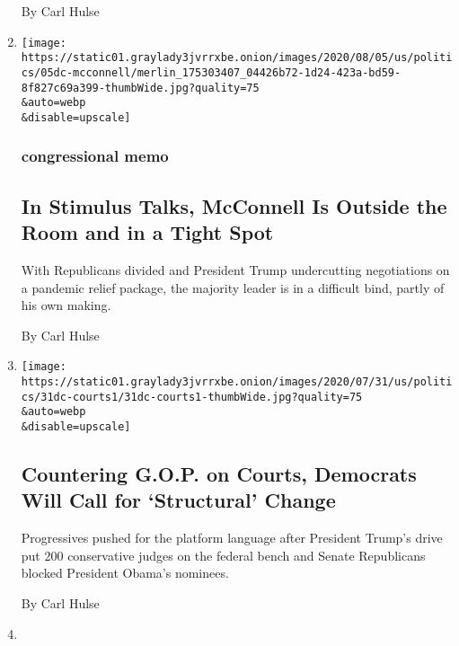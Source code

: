 \begin{enumerate}
  By Carl Hulse
\item
  \href{/2020/08/05/us/politics/mcconnell-stimulus-talks-coronavirus.html}{}

  \texttt{[image: https://static01.graylady3jvrrxbe.onion/images/2020/08/05/us/politics/05dc-mcconnell/merlin\_175303407\_04426b72-1d24-423a-bd59-8f827c69a399-thumbWide.jpg?quality=75\\\&auto=webp\\\&disable=upscale]}

  \hypertarget{congressional-memo}{%
  \subsubsection{congressional memo}\label{congressional-memo}}

  \hypertarget{in-stimulus-talks-mcconnell-is-outside-the-room-and-in-a-tight-spot}{%
  \subsection{In Stimulus Talks, McConnell Is Outside the Room and in a
  Tight
  Spot}\label{in-stimulus-talks-mcconnell-is-outside-the-room-and-in-a-tight-spot}}

  With Republicans divided and President Trump undercutting negotiations
  on a pandemic relief package, the majority leader is in a difficult
  bind, partly of his own making.

  By Carl Hulse
\item
  \href{/2020/07/31/us/democrats-judiciary-reform.html}{}

  \texttt{[image: https://static01.graylady3jvrrxbe.onion/images/2020/07/31/us/politics/31dc-courts1/31dc-courts1-thumbWide.jpg?quality=75\\\&auto=webp\\\&disable=upscale]}

  \hypertarget{countering-gop-on-courts-democrats-will-call-for-structural-change}{%
  \subsection{Countering G.O.P. on Courts, Democrats Will Call for
  `Structural'
  Change}\label{countering-gop-on-courts-democrats-will-call-for-structural-change}}

  Progressives pushed for the platform language after President Trump's
  drive put 200 conservative judges on the federal bench and Senate
  Republicans blocked President Obama's nominees.

  By Carl Hulse
\item
  \href{/2020/07/30/us/obama-filibuster-senate-democrats.html}{}


\end{enumerate}
